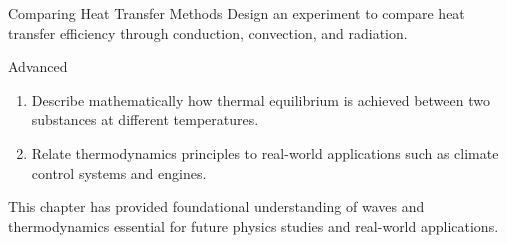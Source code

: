 \begin{investigation}{Comparing Heat Transfer Methods}
Design an experiment to compare heat transfer efficiency through conduction, convection, and radiation.
\end{investigation}

\begin{tieredquestions}{Advanced}
\begin{enumerate}
\item Describe mathematically how thermal equilibrium is achieved between two substances at different temperatures.
\item Relate thermodynamics principles to real-world applications such as climate control systems and engines.
\end{enumerate}
\end{tieredquestions}

\FloatBarrier

This chapter has provided foundational understanding of waves and thermodynamics essential for future physics studies and real-world applications.